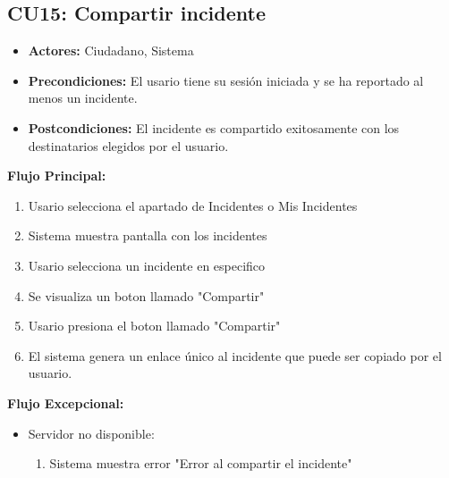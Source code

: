 \begin{multicols}{2}
\subsection*{CU15: Compartir incidente}
\begin{itemize}
    \item \textbf{Actores:} Ciudadano, Sistema
    \item \textbf{Precondiciones:} El usario tiene su sesión iniciada y se ha reportado al menos un incidente.
    \item \textbf{Postcondiciones:} El incidente es compartido exitosamente con los destinatarios elegidos por el usuario.
\end{itemize}
\textbf{Flujo Principal:}
\begin{enumerate}
    \item Usario selecciona el apartado de Incidentes o Mis Incidentes
    \item Sistema muestra pantalla con los incidentes
    \item Usario selecciona un incidente en especifico
    \item Se visualiza un boton llamado "Compartir"
    \item Usario presiona el boton llamado "Compartir"
    \item El sistema genera un enlace único al incidente que puede ser copiado por el usuario.
\end{enumerate}


\textbf{Flujo Excepcional:}
\begin{itemize}
    \item Servidor no disponible:
    \begin{enumerate}
        \item Sistema muestra error "Error al compartir el incidente"
    \end{enumerate}
\end{itemize}


\end{multicols}
